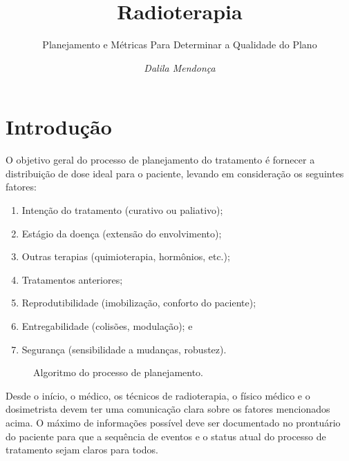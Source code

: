 \documentclass[11pt,a4paper]{article}
\title{\LobsterTwo\Huge{Radioterapia}}
\author{\LobsterTwo\Large{Planejamento e Métricas Para Determinar a Qualidade do Plano}\nocite{*}}
\date{\LobsterTwo\textit{Dalila Mendonça}}
\begin{document}
	\maketitle

\section{Introdução}

	O objetivo geral do processo de planejamento do tratamento é fornecer a distribuição de dose ideal para o paciente, levando em consideração os seguintes fatores:

	\begin{enumerate}[label=\textcolor{CarnationPink}{(\roman*)}]
		\item Intenção do tratamento (curativo ou paliativo);
		\item Estágio da doença (extensão do envolvimento);
		\item Outras terapias (quimioterapia, hormônios, etc.);
		\item Tratamentos anteriores;
		\item Reprodutibilidade (imobilização, conforto do paciente);
		\item Entregabilidade (colisões, modulação); e
		\item Segurança (sensibilidade a mudanças, robustez).
	\end{enumerate}

	\begin{figure}
		\centering
		\caption{Algoritmo do processo de planejamento.}
		\label{fig:FluxogramadePlanejamento}
	\end{figure}

	Desde o início, o médico, os técnicos de radioterapia, o físico médico e o dosimetrista devem ter uma comunicação clara sobre os fatores mencionados acima. O máximo de informações possível deve ser documentado no prontuário do paciente para que a sequência de eventos e o status atual do processo de tratamento sejam claros para todos. 
	
\end{document}
